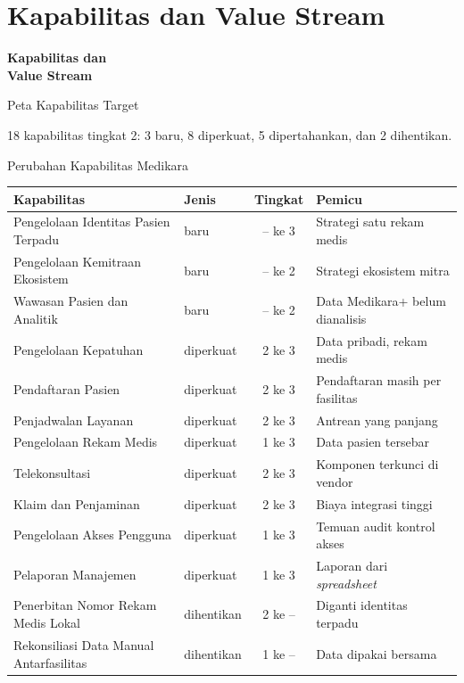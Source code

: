 \documentclass[aspectratio=169, table, 12pt]{beamer}
\begin{document}
\section{Kapabilitas dan Value Stream}

\begin{frame}{\hfill}
  \centering
  \Huge{\textbf{Kapabilitas dan\\Value Stream}}
\end{frame}

\begin{frame}{{\Large Peta Kapabilitas Target}}
  \centering

  \vspace{4pt}
  {\small 18 kapabilitas tingkat 2: 3 baru, 8 diperkuat, 5 dipertahankan, dan 2 dihentikan.\par}
\end{frame}

\begin{frame}{{\Large Perubahan Kapabilitas Medikara}}
  \scriptsize
  \begin{tabularx}{\textwidth}{>{\raggedright\arraybackslash}p{5.6cm}lc>{\raggedright\arraybackslash}X}
    \hline
    \textbf{Kapabilitas} & \textbf{Jenis} & \textbf{Tingkat} & \textbf{Pemicu} \\
    \hline
    Pengelolaan Identitas Pasien Terpadu & baru & -- ke 3 & Strategi satu rekam medis \\
    \hline
    Pengelolaan Kemitraan Ekosistem & baru & -- ke 2 & Strategi ekosistem mitra \\
    \hline
    Wawasan Pasien dan Analitik & baru & -- ke 2 & Data Medikara+ belum dianalisis \\
    \hline
    Pengelolaan Kepatuhan & diperkuat & 2 ke 3 & Data pribadi, rekam medis \\
    \hline
    Pendaftaran Pasien & diperkuat & 2 ke 3 & Pendaftaran masih per fasilitas \\
    \hline
    Penjadwalan Layanan & diperkuat & 2 ke 3 & Antrean yang panjang \\
    \hline
    Pengelolaan Rekam Medis & diperkuat & 1 ke 3 & Data pasien tersebar \\
    \hline
    Telekonsultasi & diperkuat & 2 ke 3 & Komponen terkunci di vendor \\
    \hline
    Klaim dan Penjaminan & diperkuat & 2 ke 3 & Biaya integrasi tinggi \\
    \hline
    Pengelolaan Akses Pengguna & diperkuat & 1 ke 3 & Temuan audit kontrol akses \\
    \hline
    Pelaporan Manajemen & diperkuat & 1 ke 3 & Laporan dari \textit{spreadsheet} \\
    \hline
    Penerbitan Nomor Rekam Medis Lokal & dihentikan & 2 ke -- & Diganti identitas terpadu \\
    \hline
    Rekonsiliasi Data Manual Antarfasilitas & dihentikan & 1 ke -- & Data dipakai bersama \\
    \hline
  \end{tabularx}
\end{frame}
\end{document}
